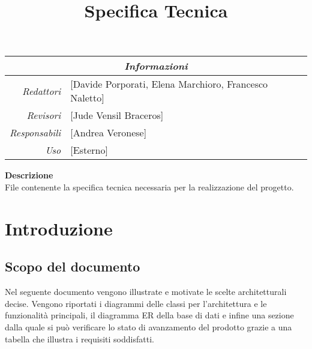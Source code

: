 \documentclass[12pt]{article}
\begin{document}
\setcounter{tocdepth}{4}
\setcounter{secnumdepth}{4}
\title{Specifica Tecnica}

\firstPage
\pagebreak

\maketitle

\begin{center}
    \begin{tabular}{r | l}
		\multicolumn{2}{c}{\textit{Informazioni}}\\
		\hline
		
			\textit{Redattori} &
			[Davide Porporati, Elena Marchioro, Francesco Naletto]\makecell{}\\

			\textit{Revisori} &
			[Jude Vensil Braceros]\makecell{}\\
			\textit{Responsabili} &
			[Andrea Veronese]\makecell{}\\
		      \textit{Uso} & 
                [Esterno]\makecell{}\\
    \end{tabular}
\end{center}

\begin{center}
    \textbf{Descrizione}\\
	File contenente la specifica tecnica necessaria per la realizzazione del progetto. 
\end{center}

\pagebreak

\makeversioni

\tableofcontents

\pagebreak

\graphicspath{ {./UML/images/} }

\section{Introduzione}

\subsection{Scopo del documento}
Nel seguente documento vengono illustrate e motivate le scelte architetturali decise. Vengono riportati i diagrammi delle classi per l'architettura e le funzionalità principali,
il diagramma ER della base di dati e infine una sezione dalla quale si può verificare lo stato di avanzamento del prodotto grazie a una tabella che illustra
i requisiti soddisfatti.
\end{document}
